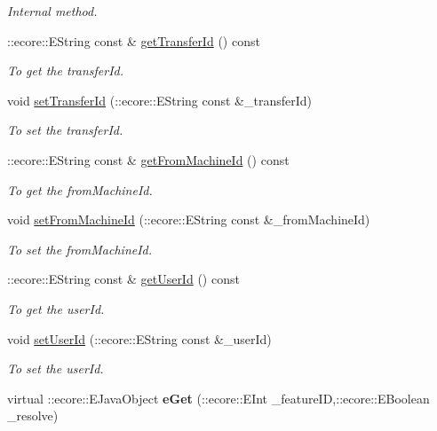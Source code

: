 \begin{DoxyCompactItemize}
\begin{DoxyCompactList}\small\item\em Internal method. \item\end{DoxyCompactList}\item 
::ecore::EString const \& \hyperlink{classFMS__Data_1_1StopTransferOptions_ae61da92235e5f8928d9dc6c7936a610a}{getTransferId} () const 
\begin{DoxyCompactList}\small\item\em To get the transferId. \item\end{DoxyCompactList}\item 
void \hyperlink{classFMS__Data_1_1StopTransferOptions_a736da9b1b936faf3c399226e3ac908ea}{setTransferId} (::ecore::EString const \&\_\-transferId)
\begin{DoxyCompactList}\small\item\em To set the transferId. \item\end{DoxyCompactList}\item 
::ecore::EString const \& \hyperlink{classFMS__Data_1_1StopTransferOptions_ae197a6b130bd8a549f1c74746933523a}{getFromMachineId} () const 
\begin{DoxyCompactList}\small\item\em To get the fromMachineId. \item\end{DoxyCompactList}\item 
void \hyperlink{classFMS__Data_1_1StopTransferOptions_af2897aa17d925e82543efdb68cf9943b}{setFromMachineId} (::ecore::EString const \&\_\-fromMachineId)
\begin{DoxyCompactList}\small\item\em To set the fromMachineId. \item\end{DoxyCompactList}\item 
::ecore::EString const \& \hyperlink{classFMS__Data_1_1StopTransferOptions_a78d6fd25a0f34eb53d7d7eb0f38ebd5a}{getUserId} () const 
\begin{DoxyCompactList}\small\item\em To get the userId. \item\end{DoxyCompactList}\item 
void \hyperlink{classFMS__Data_1_1StopTransferOptions_a85e99a697accbf5be3a2325ab46e385b}{setUserId} (::ecore::EString const \&\_\-userId)
\begin{DoxyCompactList}\small\item\em To set the userId. \item\end{DoxyCompactList}\item 
\hypertarget{classFMS__Data_1_1StopTransferOptions_aba217957f3b645e96da51b40eebd6873}{
virtual ::ecore::EJavaObject {\bfseries eGet} (::ecore::EInt \_\-featureID,::ecore::EBoolean \_\-resolve)}
\label{classFMS__Data_1_1StopTransferOptions_aba217957f3b645e96da51b40eebd6873}


\end{DoxyCompactItemize}
